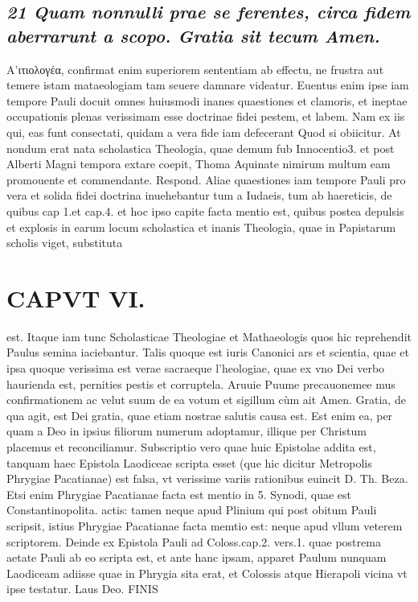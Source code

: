 \documentclass{article}
\begin{document}
\begin{pages}
\subsection*{\textit{21 Quam nonnulli prae se ferentes, circa fidem aberrarunt a scopo. Gratia sit tecum Amen. }}\pstart Α'ιτιολογέα, confirmat enim superiorem sententiam ab effectu, ne frustra aut temere istam mataeologiam tam seuere damnare videatur. Euentus enim ipse iam tempore Pauli docuit omnes huiusmodi inanes quaestiones et clamoris, et ineptae occupationis plenas verissimam esse doctrinae fidei pestem, et labem. Nam ex iis qui, eas funt consectati, quidam a vera fide iam defecerant Quod si obiicitur. At nondum erat nata scholastica Theologia, quae demum fub Innocentio3. et post Alberti Magni tempora extare coepit, Thoma Aquinate nimirum multum eam promouente et commendante. Respond. Aliae quaestiones iam tempore Pauli pro vera et solida fidei doctrina inuehebantur tum a Iudaeis, tum ab haereticis, de quibus cap 1.et cap.4. et hoc ipso capite facta mentio est, quibus postea depulsis et explosis in earum locum scholastica et inanis Theologia, quae in Papistarum scholis viget, substituta  \pend
\section*{CAPVT VI. }
\marginpar{[ p.513 ]}\pstart est. Itaque iam tunc Scholasticae Theologiae et Mathaeologis quos hic reprehendit Paulus semina iaciebantur. Talis quoque est iuris Canonici ars et scientia, quae et ipsa quoque verissima est verae sacraeque l’heologiae, quae ex vno Dei verbo haurienda est, pernities pestis et corruptela.  \pend\pstart Aruuie Puume precauonemee mus confirmationem ac velut suum de ea votum et sigillum cùm ait Amen.  \pend\pstart Gratia, de qua agit, est Dei gratia, quae etiam nostrae salutis causa est. Est enim ea, per quam a Deo in ipsius filiorum numerum adoptamur, illique per Christum placemus et reconciliamur. Subscriptio vero quae huic Epistolae addita est, tanquam haec Epistola Laodiceae scripta esset (que hic dicitur Metropolis Phrygiae Pacatianae) est falsa, vt verissime variis rationibus euincit D. Th. Beza. Etsi enim Phrygiae Pacatianae facta est mentio in 5. Synodi, quae est Constantinopolita. actis: tamen neque apud Plinium qui post obitum Pauli scripsit, istius Phrygiae Pacatianae facta memtio est: neque apud vllum veterem scriptorem. Deinde ex Epistola Pauli ad Coloss.cap.2. vers.1. quae postrema aetate Pauli ab eo scripta est, et ante hanc ipsam, apparet Paulum nunquam Laodiceam adiisse quae in Phrygia sita erat, et Colossis atque  Hierapoli vicina vt ipse testatur. Laus Deo. FINIS  \pend
\endnumbering
\end{pages}
\end{document}
